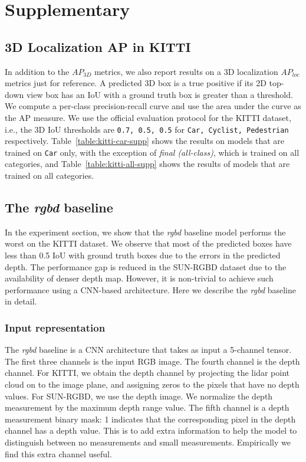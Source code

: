 \documentclass[10pt,twocolumn,letterpaper]{article}
\begin{document}
{\small


}

\section{Supplementary}
\subsection{3D Localization AP in KITTI} In addition to the $AP_{3D}$ metrics, we also report results on a 3D localization $AP_{loc}$ metrics just for reference.  A predicted 3D box is a true positive if its 2D top-down view box has an IoU with a ground truth box is greater than a threshold.  We compute a per-class precision-recall curve and use the area under the curve as the AP measure. 
We use the official evaluation protocol for the KITTI dataset, i.e., the 3D IoU thresholds are \texttt{0.7, 0.5, 0.5} for \texttt{Car, Cyclist, Pedestrian} respectively. Table~\ref{table:kitti-car-supp} shows the results on models that are trained on \texttt{Car} only, with the exception of \textit{final (all-class)}, which is trained on all categories, and Table~\ref{table:kitti-all-supp} shows the results of models that are trained on all categories. 

\subsection{The \textit{rgbd} baseline} In the experiment section, we show that the \textit{rgbd} baseline model performs the worst on the KITTI dataset. We observe that most of the predicted boxes have less than 0.5 IoU with ground truth boxes due to the errors in the predicted depth. The performance gap is reduced in the SUN-RGBD dataset due to the availability of denser depth map. However, it is non-trivial to achieve such performance using a CNN-based architecture. Here we describe the \textit{rgbd} baseline in detail. 

\subsubsection{Input representation} The \textit{rgbd} baseline is a CNN architecture that takes as input a 5-channel tensor. The first three channels is the input RGB image. The fourth channel is the depth channel. For KITTI, we obtain the depth channel by projecting the lidar point cloud on to the image plane, and assigning zeros to the pixels that have no depth values. For SUN-RGBD, we use the depth image. We normalize the depth measurement by the maximum depth range value. The fifth channel is a depth measurement binary mask: 1 indicates that the corresponding pixel in the depth channel has a depth value. This is to add extra information to help the model to distinguish between no measurements and small measurements. Empirically we find this extra channel useful.
\end{document}
